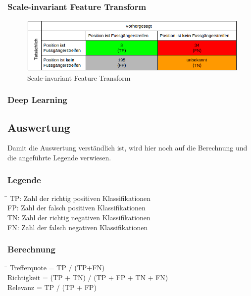 \subsubsection{Scale-invariant Feature Transform}	
\begin{figure}[ht]
\includegraphics[width=\textwidth]{images/sif_conf.png}
\caption[Scale-invariant Feature Transform]{Scale-invariant Feature Transform}
\end{figure}
\subsubsection{Deep Learning}	

\subsection{Auswertung}
Damit die Auswertung verständlich ist, wird hier noch auf die Berechnung und die angeführte Legende verwiesen.
\subsubsection{Legende}
\begin{tabbing}
    \hspace*{3cm}\=\hspace*{6cm}\= \kill
    TP:	\> Zahl der richtig positiven Klassifikationen\\
	FP:	\> Zahl der falsch positiven Klassifikationen\\
	TN:	\> Zahl der richtig negativen Klassifikationen\\
	FN:	\> Zahl der falsch negativen Klassifikationen\\
\end{tabbing}

\subsubsection{Berechnung}
\begin{tabbing}
    \hspace*{3cm}\=\hspace*{3cm}\=\hspace*{6cm}\= \kill
	Trefferquote \> = \> TP / (TP+FN)\\
	Richtigkeit \> = \> (TP + TN) / (TP + FP + TN + FN)\\
	Relevanz \> = \> TP / (TP + FP)\\
\end{tabbing}


